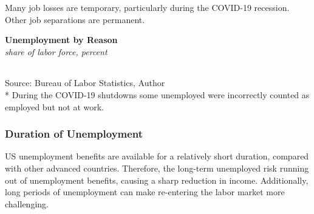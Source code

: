 \documentclass{report}
\begin{document}
{\begin{minipage}{0.76\textwidth}
\small Many job losses are temporary, particularly during the COVID-19 recession. Other job separations are permanent. 
\vspace{1mm}

\normalsize \textbf{Unemployment by Reason}\\
\footnotesize{\textit{share of labor force, percent}}\\
 \setlength{\tabcolsep}{1.2pt} \color{black!90}
	{\renewcommand{\arraystretch}{1.5}
		\begin{tabular}{p{36mm} R{9mm} R{9mm} R{9mm} R{9mm} R{9mm} 
		   R{9mm} R{9mm} R{9mm} R{9mm}}
			  \hline
		\end{tabular}}\vspace{-1mm}
		
\footnotesize{Source: Bureau of Labor Statistics, Author}\\
\footnotesize{* During the COVID-19 shutdowns some unemployed were incorrectly counted as employed but not at work.}
\end{minipage}
\newpage
\begin{minipage}{0.76\textwidth} 
\subsubsection*{Duration of Unemployment}
\small US unemployment benefits are available for a relatively short duration, compared with other advanced countries. Therefore, the long-term unemployed risk running out of unemployment benefits, causing a sharp reduction in income. Additionally, long periods of unemployment can make re-entering the labor market more challenging. 


\vspace{1mm}


\end{minipage}}
\end{document}
